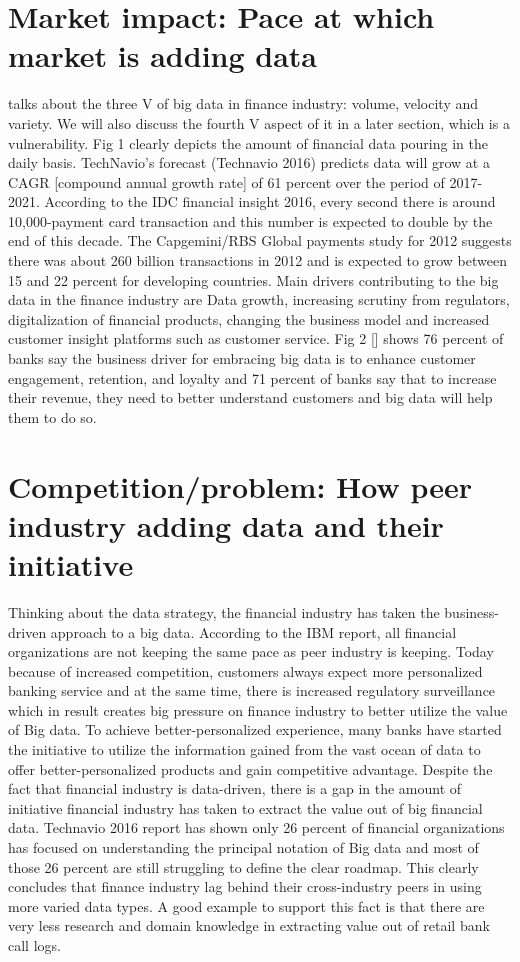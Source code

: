 \documentclass[sigconf]{acmart}
\begin{document}
\section{Market impact: Pace at which market is adding data}

\cite{Ref2}  talks about the three V of big data in finance industry: volume, velocity and variety. We will also discuss the fourth V aspect of it in a later section, which is a vulnerability. Fig 1 \cite{Ref3} clearly depicts the amount of financial data pouring in the daily basis. TechNavio’s forecast (Technavio 2016) predicts data will grow at a CAGR [compound annual growth rate] of 61 percent over the period of 2017-2021. According to the IDC financial insight 2016, every second there is around 10,000-payment card transaction and this number is expected to double by the end of this decade. The Capgemini/RBS Global payments study for 2012 suggests there was about 260 billion transactions in 2012 and is expected to grow between 15 and 22 percent for developing countries. Main drivers contributing to the big data in the finance industry are Data growth, increasing scrutiny from regulators, digitalization of financial products, changing the business model and increased customer insight platforms such as customer service.  Fig 2 [\cite{Ref2}] shows 76 percent of banks say the business driver for embracing big data is to enhance customer engagement, retention, and loyalty and 71 percent of banks say that to increase their revenue, they need to better understand customers and big data will help them to do so. 

\section{Competition/problem: How peer industry adding data and their initiative  }

Thinking about the data strategy, the financial industry has taken the business-driven approach to a big data. According to the IBM report, all financial organizations are not keeping the same pace as peer industry is keeping. Today because of increased competition, customers always expect more personalized banking service and at the same time, there is increased regulatory surveillance which in result creates big pressure on finance industry to better utilize the value of Big data. To achieve better-personalized experience, many banks have started the initiative to utilize the information gained from the vast ocean of data to offer better-personalized products and gain competitive advantage.  Despite the fact that financial industry is data-driven, there is a gap in the amount of initiative financial industry has taken to extract the value out of big financial data.  Technavio 2016 report has shown only 26 percent of financial organizations has focused on understanding the principal notation of Big data and most of those 26 percent are still struggling to define the clear roadmap. This clearly concludes that finance industry lag behind their cross-industry peers in using more varied data types. A good example to support this fact is that there are very less research and domain knowledge in extracting value out of retail bank call logs. 
\end{document}
